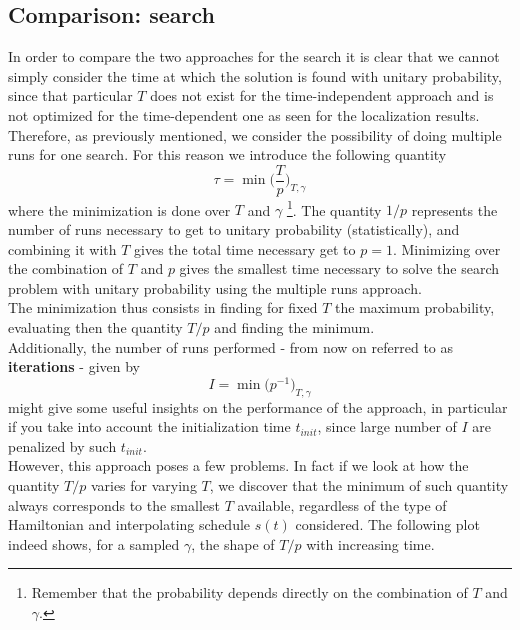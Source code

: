     \subsection{Comparison: search}
        In order to compare the two approaches for the search it is clear that we cannot simply consider the time at which the solution is found with unitary probability, since that particular $T$ does not exist for the time-independent approach and is not optimized for the time-dependent one as seen for the localization results. Therefore, as previously mentioned, we consider the possibility of doing multiple runs for one search. For this reason we introduce the following quantity
        \begin{equation}
          \tau = \min\bigg(\frac{T}{p}\bigg)_{T, \gamma}
        \end{equation}
        where the minimization is done over $T$ and $\gamma$ \footnote{Remember that the probability depends directly on the combination of $T$ and $\gamma$.}. The quantity $1/p$ represents the number of runs necessary to get to unitary probability (statistically), and combining it with $T$ gives the total time necessary get to $p=1$. Minimizing over the combination of $T$ and $p$ gives the smallest time necessary to solve the search problem with unitary probability using the multiple runs approach.\\ The minimization thus consists in finding for fixed $T$ the maximum probability, evaluating then the quantity $T/p$ and finding the minimum. \\

        \noindent
        Additionally, the number of runs performed - from now on referred to as \textbf{iterations} - given by
        \begin{equation}
          I = \min\big(p^{-1}\big)_{T,\gamma}
        \end{equation}
        might give some useful insights on the performance of the approach, in particular if you take into account the initialization time $t_{init}$, since large number of $I$ are penalized by such $t_{init}$.\\


        \noindent
        However, this approach poses a few problems. In fact if we look at how the quantity $T/p$ varies for varying $T$, we discover that the minimum of such quantity always corresponds to the smallest $T$ available, regardless of the type of Hamiltonian and interpolating schedule $s(t)$ considered. The following plot indeed shows, for a sampled $\gamma$, the shape of $T/p$ with increasing time. \\
        \clearpage
        

